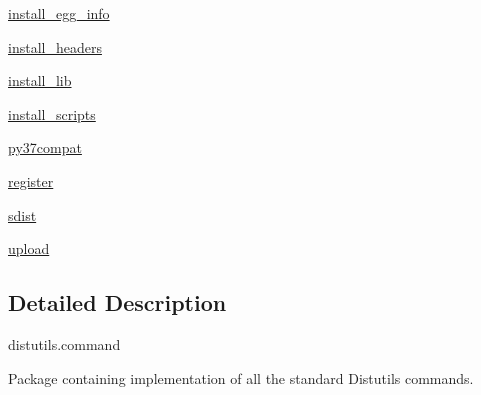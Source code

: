 \begin{DoxyCompactItemize}
\item 
 \hyperlink{namespacesetuptools_1_1__distutils_1_1command_1_1install__egg__info}{install\+\_\+egg\+\_\+info}
\item 
 \hyperlink{namespacesetuptools_1_1__distutils_1_1command_1_1install__headers}{install\+\_\+headers}
\item 
 \hyperlink{namespacesetuptools_1_1__distutils_1_1command_1_1install__lib}{install\+\_\+lib}
\item 
 \hyperlink{namespacesetuptools_1_1__distutils_1_1command_1_1install__scripts}{install\+\_\+scripts}
\item 
 \hyperlink{namespacesetuptools_1_1__distutils_1_1command_1_1py37compat}{py37compat}
\item 
 \hyperlink{namespacesetuptools_1_1__distutils_1_1command_1_1register}{register}
\item 
 \hyperlink{namespacesetuptools_1_1__distutils_1_1command_1_1sdist}{sdist}
\item 
 \hyperlink{namespacesetuptools_1_1__distutils_1_1command_1_1upload}{upload}
\end{DoxyCompactItemize}


\subsection{Detailed Description}
\begin{DoxyVerb}distutils.command

Package containing implementation of all the standard Distutils
commands.\end{DoxyVerb}
 